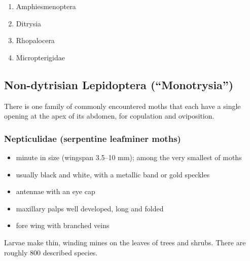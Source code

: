 \documentclass[letterpaper, 11pt]{article}
\begin{document}
\begin{enumerate} 
\item Amphiesmenoptera
\item Ditrysia
\item Rhopalocera
\item Micropterigidae
\end{enumerate}

\subsection{Non-dytrisian Lepidoptera (``Monotrysia'')}
There is one family of commonly encountered moths that each have a single opening at the apex of its abdomen, for copulation and oviposition.

\subsubsection{Nepticulidae (serpentine leafminer moths)}
\begin{itemize}
\item minute in size (wingspan 3.5--10 mm); among the very smallest of moths
\item usually black and white, with a metallic band or gold speckles 
\item antennae with an eye cap
\item maxillary palps well developed, long and folded
\item fore wing with branched veins
\end{itemize}
Larvae make thin, winding mines on the leaves of trees and shrubs. There are roughly 800 described species.
\end{document}
